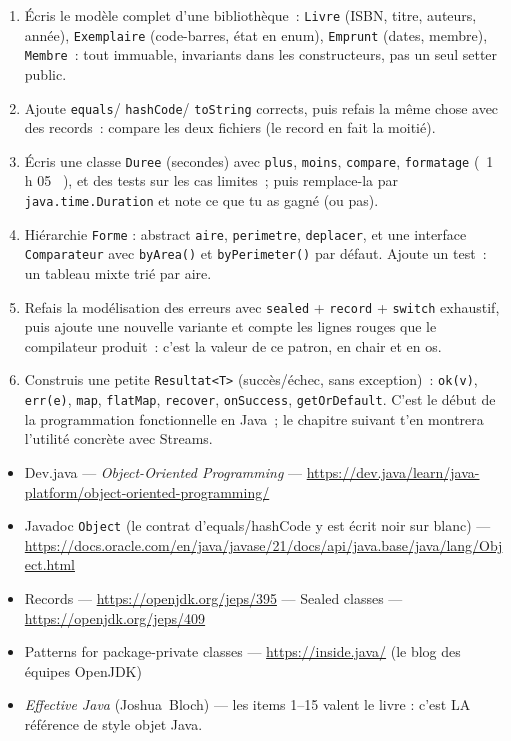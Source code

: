 \documentclass[12pt,a4paper,twoside,openright]{book}
\begin{document}
\begin{exercice}
\begin{enumerate}
  \item \'Ecris le mod\`ele complet d'une biblioth\`eque~: \verb|Livre| (ISBN, titre, auteurs, ann\'ee),
        \verb|Exemplaire| (code-barres, \'etat en enum), \verb|Emprunt| (dates, membre),
        \verb|Membre|~: tout immuable, invariants dans les constructeurs, pas un seul setter public.
  \item Ajoute \verb|equals|/ \verb|hashCode|/ \verb|toString| corrects, puis refais la m\^eme
        chose avec des records~: compare les deux fichiers (le record en fait la moiti\'e).
  \item \'Ecris une classe \verb|Duree| (secondes) avec \verb|plus|, \verb|moins|, \verb|compare|,
        \verb|formatage| (\og ~1 h 05~ \fg{}), et des tests sur les cas limites~; puis remplace-la par
        \verb|java.time.Duration| et note ce que tu as gagn\'e (ou pas).
  \item Hi\'erarchie \verb|Forme| : abstract \verb|aire|, \verb|perimetre|, \verb|deplacer|, et une
        interface \verb|Comparateur| avec \verb|byArea()| et \verb|byPerimeter()| par d\'efaut.
        Ajoute un test~: un tableau mixte tri\'e par aire.
  \item Refais la mod\'elisation des erreurs avec \verb|sealed| + \verb|record| + \verb|switch|
        exhaustif, puis ajoute une nouvelle variante et compte les lignes rouges que le compilateur
        produit~: c'est la valeur de ce patron, en chair et en os.
  \item Construis une petite \verb|Resultat<T>| (succ\`es/\'echec, sans exception)~:
        \verb|ok(v)|, \verb|err(e)|, \verb|map|, \verb|flatMap|, \verb|recover|, \verb|onSuccess|,
        \verb|getOrDefault|. C'est le d\'ebut de la programmation fonctionnelle en Java~; le
        chapitre suivant t'en montrera l'utilit\'e concr\`ete avec Streams.
\end{enumerate}
\end{exercice}

\begin{ressources}
\begin{itemize}
  \item Dev.java --- \emph{Object-Oriented Programming} --- \url{https://dev.java/learn/java-platform/object-oriented-programming/}
  \item Javadoc \verb|Object| (le contrat d'equals/hashCode y est \'ecrit noir sur blanc) --- \url{https://docs.oracle.com/en/java/javase/21/docs/api/java.base/java/lang/Object.html}
  \item Records --- \url{https://openjdk.org/jeps/395} --- Sealed classes --- \url{https://openjdk.org/jeps/409}
  \item Patterns for package-private classes --- \url{https://inside.java/} (le blog des \'equipes OpenJDK)
  \item \emph{Effective Java} (Joshua~Bloch) --- les items 1--15 valent le livre : c'est LA r\'ef\'erence de style objet Java.
\end{itemize}
\end{ressources}
\end{document}
